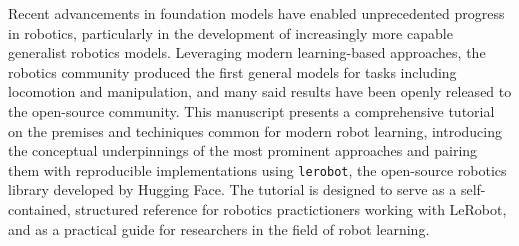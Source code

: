 Recent advancements in foundation models have enabled unprecedented progress in robotics, particularly in the development of increasingly more capable generalist robotics models.
Leveraging modern learning-based approaches, the robotics community produced the first general models for tasks including locomotion and manipulation, and many said results have been openly released to the open-source community.
This manuscript presents a comprehensive tutorial on the premises and techiniques common for modern robot learning, introducing the conceptual underpinnings of the most prominent approaches and pairing them with reproducible implementations using \texttt{lerobot}, the open-source robotics library developed by Hugging Face.
The tutorial is designed to serve as a self-contained, structured reference for robotics practictioners working with LeRobot, and as a practical guide for researchers in the field of robot learning.